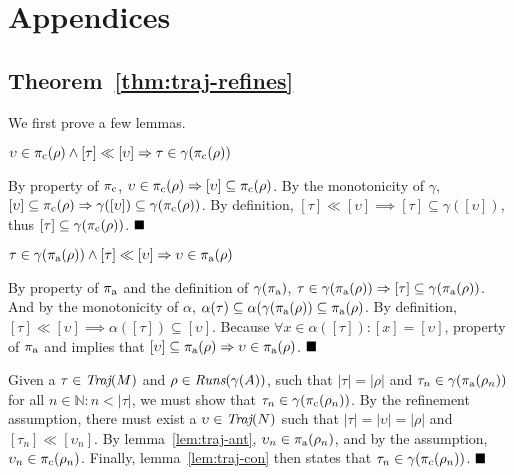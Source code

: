 \section{Appendices}

\subsection{Theorem~\ref{thm:traj-refines}}

We first prove a few lemmas.

\begin{lemma} \label{lem:traj-con}
$\upsilon \in \operatorname{\pi_{\textrm{c}}}(\rho) \wedge [\tau] \ll [\upsilon] \Rightarrow \tau \in \gamma(\operatorname{\pi_{\textrm{c}}}(\rho))$
\end{lemma}

By property  of $\operatorname{\pi_{\textrm{c}}}$, $\upsilon \in \operatorname{\pi_{\textrm{c}}}(\rho) \Rightarrow [\upsilon] \subseteq \operatorname{\pi_{\textrm{c}}}(\rho)$. By the monotonicity of $\gamma$, $[\upsilon] \subseteq \operatorname{\pi_{\textrm{c}}}(\rho) \Rightarrow \gamma([\upsilon]) \subseteq \gamma(\operatorname{\pi_{\textrm{c}}}(\rho))$. By definition, $[\tau] \ll [\upsilon] \implies [\tau] \subseteq \gamma([\upsilon])$, thus $[\tau] \subseteq \gamma(\operatorname{\pi_{\textrm{c}}}(\rho))$. $\qedbox$

\begin{lemma} \label{lem:traj-ant}
$\tau \in \gamma(\operatorname{\pi_{\textrm{a}}}(\rho)) \wedge [\tau] \ll [\upsilon] \Rightarrow \upsilon \in \operatorname{\pi_{\textrm{a}}}(\rho)$
\end{lemma}

By property  of $\operatorname{\pi_{\textrm{a}}}$ and the definition of $\gamma(\operatorname{\pi_{\textrm{a}}})$, $\tau \in \gamma(\operatorname{\pi_{\textrm{a}}}(\rho)) \Rightarrow [\tau] \subseteq \gamma(\operatorname{\pi_{\textrm{a}}}(\rho))$. And by the monotonicity of $\alpha$, $\alpha(\tau) \subseteq \alpha(\gamma(\operatorname{\pi_{\textrm{a}}}(\rho)) \subseteq \operatorname{\pi_{\textrm{a}}}(\rho)$. By definition, $[\tau] \ll [\upsilon] \implies \alpha([\tau]) \subseteq [\upsilon]$. Because $\forall x \in \alpha([\tau]) : [x] = [\upsilon]$, property  of $\operatorname{\pi_{\textrm{a}}}$ and implies that $[\upsilon] \subseteq \operatorname{\pi_{\textrm{a}}}(\rho) \Rightarrow \upsilon \in \operatorname{\pi_{\textrm{a}}}(\rho)$. $\qedbox$

Given a $\tau \in \operatorname{\textit{Traj}}(M)$ and $\rho \in \operatorname{\textit{Runs}}(\gamma(A))$, such that $| \tau | = | \rho |$ and $\tau_{n} \in \gamma(\operatorname{\pi_{\textrm{a}}}(\rho_{n}))$ for all $n \in \mathbb{N} : n < | \tau |$, we must show that $\tau_{n} \in \gamma(\operatorname{\pi_{\textrm{c}}}(\rho_{n}))$. By the refinement assumption, there must exist a $\upsilon \in \operatorname{\textit{Traj}}(N)$ such that $| \tau | = | \upsilon | = | \rho |$ and $[\tau_{n}] \ll [\upsilon_{n}]$. By lemma~\ref{lem:traj-ant}, $\upsilon_{n} \in \operatorname{\pi_{\textrm{a}}}(\rho_{n})$, and by the assumption, $\upsilon_{n} \in \operatorname{\pi_{\textrm{c}}}(\rho_{n})$. Finally, lemma~\ref{lem:traj-con} then states that $\tau_{n} \in \gamma(\operatorname{\pi_{\textrm{c}}}(\rho_{n}))$. $\qedbox$


